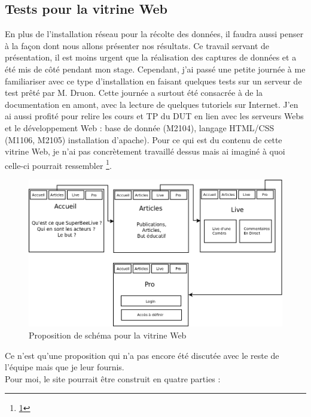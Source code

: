 \documentclass[11pt,french,a4paper]{report}
\begin{document}
        \subsection{Tests pour la vitrine Web}
En plus de l'installation réseau pour la récolte des données, il faudra aussi penser à la façon dont nous allons présenter nos 
résultats. Ce travail servant de présentation, il est moins urgent que la réalisation des captures de données et a été mis de 
côté pendant mon stage. Cependant, j'ai passé une petite journée à me familiariser avec ce type d'installation en faisant 
quelques tests sur un serveur de test prêté par M. Druon. Cette journée a surtout été consacrée à de la documentation en amont,
avec la lecture de quelques tutoriels sur Internet. J'en ai aussi profité pour relire les cours et 
TP du DUT en lien avec les serveurs Webs et le développement Web : base de donnée (M2104), langage HTML/CSS (M1106, M2105)
installation d'apache). 
Pour ce qui est du contenu de cette vitrine Web, je n'ai pas concrètement travaillé dessus mais ai imaginé à quoi celle-ci pourrait
ressembler \footnote{\ref{sch_web}}. \\
\begin{figure}[!h]
    \centering
    \includegraphics[scale=0.5]{../images/dia/sch_web.png}
    \caption{Proposition de schéma pour la vitrine Web}
    \label{sch_web}
\end{figure}
Ce n'est qu'une proposition qui n'a pas encore été discutée avec le reste de l'équipe mais que je leur fournis. \\
Pour moi, le site pourrait être construit en quatre parties : 
\end{document}
